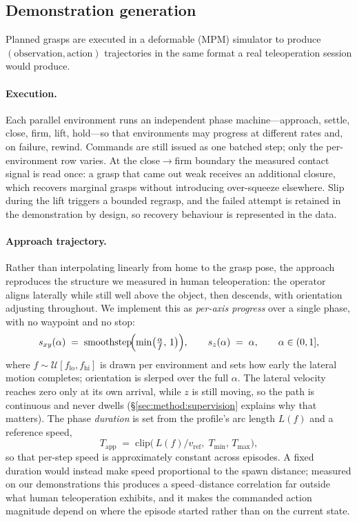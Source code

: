 \documentclass[letterpaper, 10 pt, conference]{ieeeconf}  %
\begin{document}
\subsection{Demonstration generation}
\label{sec:method:demos}

Planned grasps are executed in a deformable (MPM) simulator to produce
$(\text{observation},\text{action})$ trajectories in the same format a real teleoperation
session would produce.

\paragraph{Execution.}
Each parallel environment runs an independent phase machine---approach, settle, close,
firm, lift, hold---so that environments may progress at different rates and, on failure,
rewind. Commands are still issued as one batched step; only the per-environment row varies.
At the close$\rightarrow$firm boundary the measured contact signal is read once: a grasp that
came out weak receives an additional closure, which recovers marginal grasps without
introducing over-squeeze elsewhere. Slip during the lift triggers a bounded regrasp, and the
failed attempt is retained in the demonstration by design, so recovery behaviour is
represented in the data.

\paragraph{Approach trajectory.}
Rather than interpolating linearly from home to the grasp pose, the approach reproduces the
structure we measured in human teleoperation: the operator aligns laterally while still well
above the object, then descends, with orientation adjusting throughout. We implement this as
\emph{per-axis progress} over a single phase, with no waypoint and no stop:
\begin{equation}
  s_{xy}(\alpha) \;=\; \mathrm{smoothstep}\!\Bigl(\min\bigl(\tfrac{\alpha}{f},\,1\bigr)\Bigr),
  \qquad
  s_{z}(\alpha) \;=\; \alpha ,
  \qquad \alpha \in (0,1],
  \label{eq:approach}
\end{equation}
where $f\!\sim\!\mathcal{U}[f_{\text{lo}},f_{\text{hi}}]$ is drawn per environment and sets
how early the lateral motion completes; orientation is slerped over the full $\alpha$. The
lateral velocity reaches zero only at its own arrival, while $z$ is still moving, so the path
is continuous and never dwells (\S\ref{sec:method:supervision} explains why that matters).
The phase \emph{duration} is set from the profile's arc length $L(f)$ and a reference speed,
\begin{equation}
  T_{\text{app}} \;=\; \mathrm{clip}\bigl(\,L(f)/v_{\text{ref}},\; T_{\min},\, T_{\max}\bigr),
  \label{eq:duration}
\end{equation}
so that per-step speed is approximately constant across episodes. A fixed duration would
instead make speed proportional to the spawn distance; measured on our demonstrations this
produces a speed--distance correlation far outside what human teleoperation exhibits, and it
makes the commanded action magnitude depend on where the episode started rather than on the
current state.
\end{document}
